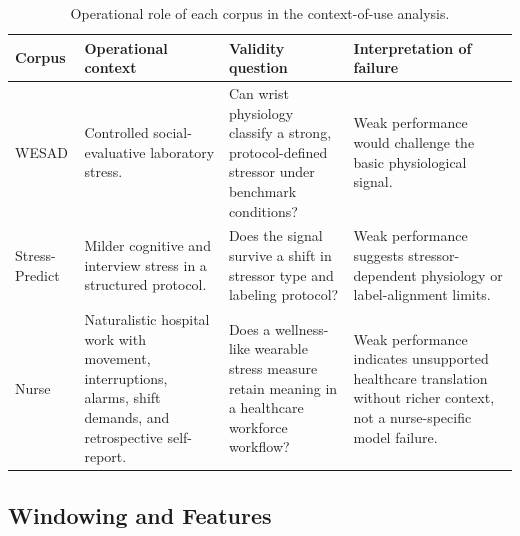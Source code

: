 \documentclass[healthcare,article,submit,moreauthors,pdftex]{Definitions/mdpi}
\begin{document}
\begin{table}[H]
\centering
\caption{Operational role of each corpus in the context-of-use analysis.\label{tab:contextdefinition}}
\begin{tabular}{@{}L{0.13\textwidth}L{0.25\textwidth}L{0.31\textwidth}L{0.23\textwidth}@{}}
\toprule
\textbf{Corpus} & \textbf{Operational context} & \textbf{Validity question} & \textbf{Interpretation of failure} \\
\midrule
WESAD &
Controlled social-evaluative laboratory stress. &
Can wrist physiology classify a strong, protocol-defined stressor under
benchmark conditions? &
Weak performance would challenge the basic physiological signal. \\
Stress-Predict &
Milder cognitive and interview stress in a structured protocol. &
Does the signal survive a shift in stressor type and labeling protocol? &
Weak performance suggests stressor-dependent physiology or label-alignment
limits. \\
Nurse &
Naturalistic hospital work with movement, interruptions, alarms, shift demands,
and retrospective self-report. &
Does a wellness-like wearable stress measure retain meaning in a healthcare
workforce workflow? &
Weak performance indicates unsupported healthcare translation without richer
context, not a nurse-specific model failure. \\
\bottomrule
\end{tabular}
\end{table}

\subsection{Windowing and Features}
\label{sec:features}
\end{document}
